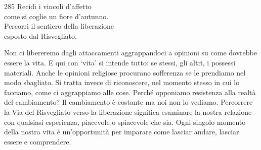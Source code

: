 
\begin{dhpVerse}{285}
\label{dhp-285}
Recidi i vincoli d'affetto\\
come si coglie un fiore d'autunno.\\
Percorri il sentiero della liberazione\\
esposto dal Risvegliato.
\end{dhpVerse}

\begin{dhpRefl}
  Non ci libereremo dagli attaccamenti aggrappandoci a opinioni su come dovrebbe
  essere la vita. E qui con `vita' si intende tutto: se stessi, gli altri, i
  possessi materiali. Anche le opinioni religiose procurano sofferenza se le
  prendiamo nel modo sbagliato. Si tratta invece di riconoscere, nel momento
  stesso in cui lo facciamo, come ci aggrappiamo alle cose. Perché opponiamo
  resistenza alla realtà del cambiamento? Il cambiamento è costante ma noi non
  lo vediamo. Percorrere la Via del Risvegliato verso la liberazione significa
  esaminare la nostra relazione con qualsiasi esperienza, piacevole o spiacevole
  che sia. Ogni singolo momento della nostra vita è un'opportunità per imparare
  come lasciar andare, lasciar essere e comprendere.
\end{dhpRefl}

